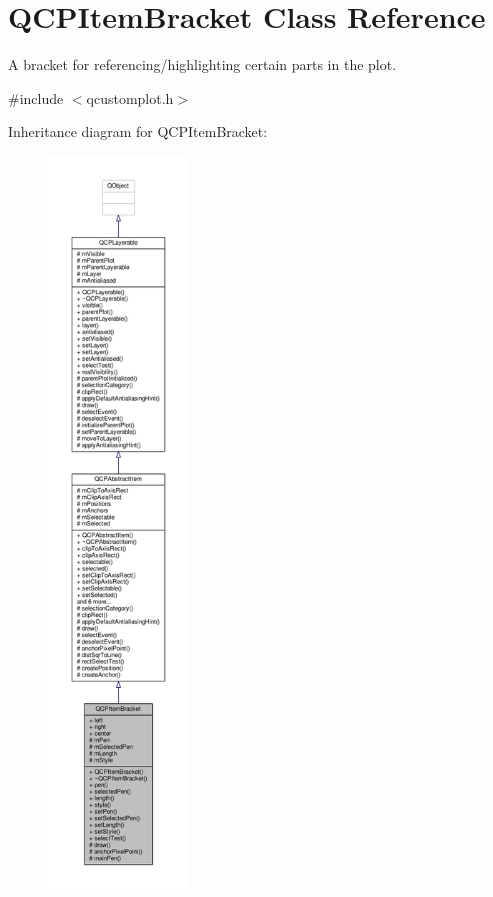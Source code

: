 \hypertarget{class_q_c_p_item_bracket}{}\section{Q\+C\+P\+Item\+Bracket Class Reference}
\label{class_q_c_p_item_bracket}


A bracket for referencing/highlighting certain parts in the plot.  




{\ttfamily \#include $<$qcustomplot.\+h$>$}



Inheritance diagram for Q\+C\+P\+Item\+Bracket\+:\nopagebreak
\begin{figure}[H]
\begin{center}
\leavevmode
\includegraphics[height=550pt]{class_q_c_p_item_bracket__inherit__graph}
\end{center}
\end{figure}


